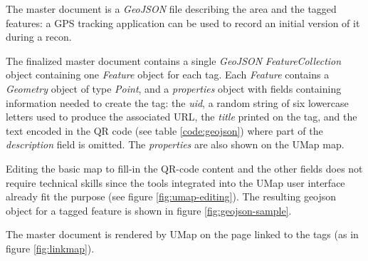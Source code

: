 \documentclass[sustainability,article,submit,pdftex,moreauthors]{Definitions/mdpi}
\begin{document}
The master document is a \emph{GeoJSON} file describing the area and the tagged features: a GPS tracking application can be used to record an initial version of it during a recon.

The finalized master document contains a single \emph{GeoJSON} \emph{FeatureCollection} object containing one \emph{Feature} object for each tag. Each \emph{Feature} contains a \emph{Geometry} object of type \emph{Point}, and a \emph{properties} object with fields containing information needed to create the tag: the \emph{uid}, a random string of six lowercase letters used to produce the associated URL, the \emph{title} printed on the tag, and the text encoded in the QR code (see table \ref{code:geojson}) where part of the {\em description} field is omitted. The \emph{properties} are also shown on the UMap map. 

Editing the basic map to fill-in the QR-code content and the other fields does not require technical skills since the tools integrated into the UMap user interface already fit the purpose (see figure \ref{fig:umap-editing}). The resulting geojson object for a tagged feature is shown in figure \ref{fig:geojson-sample}.

The master document is rendered by UMap on the page linked to the tags (as in figure \ref{fig:linkmap}).
\end{document}
